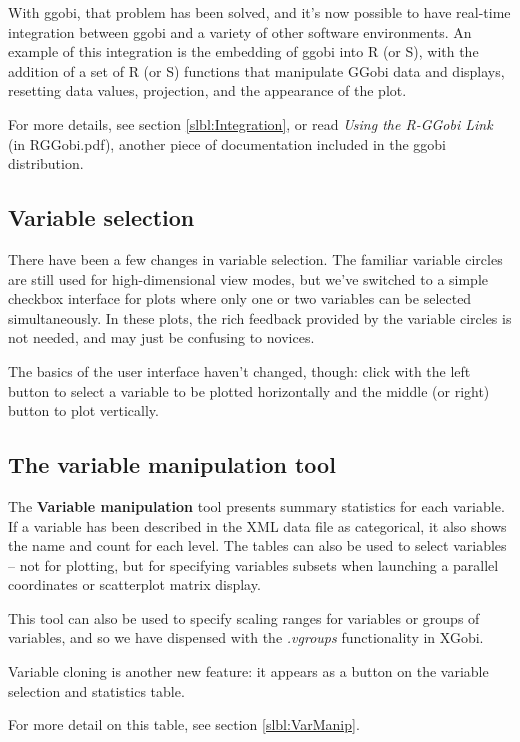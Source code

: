 \documentclass[11pt]{article}
\begin{document}
With ggobi, that problem has been solved, and it's now possible
to have real-time integration between ggobi and a variety of
other software environments.  An example of this integration is
the embedding of ggobi into R (or S), with the addition of a set of
R (or S) functions that manipulate GGobi data and displays,
resetting data values, projection, and the appearance of the plot.

For more details, see section \ref{slbl:Integration}, or read
{\em Using the R-GGobi Link} (in RGGobi.pdf), another piece of
documentation included in the ggobi distribution.

\subsection {Variable selection}

There have been a few changes in variable selection.  The familiar
variable circles are still used for high-dimensional view modes, but
we've switched to a simple checkbox interface for plots where only one
or two variables can be selected simultaneously.  In these plots, the
rich feedback provided by the variable circles is not needed, and may
just be confusing to novices.

The basics of the user interface haven't changed, though:
click with the left button to select a variable to be plotted
horizontally and the middle (or right) button to plot vertically.

\subsection {The variable manipulation tool}

The {\bf Variable manipulation} tool presents summary statistics for
each variable.  If a variable has been described in the XML data file
as categorical, it also shows the name and count for each level.
The tables can also be used to select variables -- not for plotting, but
for specifying variables subsets when launching a parallel coordinates
or scatterplot matrix display.

This tool can also be used to specify scaling ranges for variables or
groups of variables, and so we have dispensed with the {\em .vgroups}
functionality in XGobi.

Variable cloning is another new feature: it appears as a button
on the variable selection and statistics table.

For more detail on this table, see section \ref{slbl:VarManip}.
\end{document}
